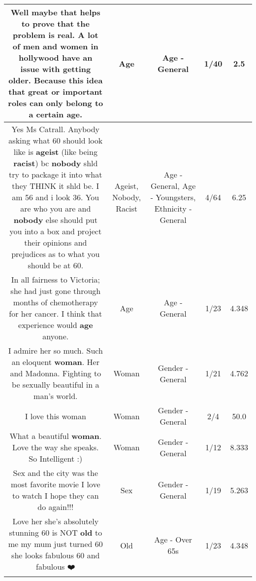 \documentclass[11pt]{article}
\newlength\mylength
\begin{document}
\begin{center}
\begin{longtable}{|C{.65\mylength}|C{.30\mylength}|C{.12\mylength}|C{.12\mylength}|C{.12\mylength}|}
  \small Well maybe that helps to prove that the problem is real. A lot of men and women in hollywood have an issue with getting older. Because this idea that great or important roles can only belong to a certain \textbf{age}.\normalsize   & Age & Age - General & 1/40 & 2.5 \\  \hline
  \small Yes Ms Catrall. Anybody asking what 60 should look like is \textbf{ageist} (like being \textbf{racist}) bc \textbf{nobody} shld try to package it into what they THINK it shld be. I am 56 and i look 36. You are who you are and \textbf{nobody} else should put you into a box and project their opinions and prejudices as to what you should be at 60.\normalsize   & Ageist, Nobody, Racist & Age - General, Age - Youngsters, Ethnicity - General & 4/64 & 6.25 \\  \hline
  \small In all fairness to Victoria; she had just gone through months of chemotherapy for her cancer. I think that experience would \textbf{age} anyone.\normalsize   & Age & Age - General & 1/23 & 4.348 \\  \hline
  \small I admire her so much. Such an eloquent \textbf{woman}. Her and Madonna. Fighting to be sexually beautiful in a man's world.\normalsize   & Woman & Gender - General & 1/21 & 4.762 \\  \hline
  \small I love this woman\normalsize   & Woman & Gender - General & 2/4 & 50.0 \\  \hline
  \small What a beautiful \textbf{woman}. Love the way she speaks. So Intelligent :)\normalsize   & Woman & Gender - General & 1/12 & 8.333 \\  \hline
  \small Sex and the city was the most favorite movie I love to watch I hope they can do again!!!\normalsize   & Sex & Gender - General & 1/19 & 5.263 \\  \hline
  \small Love her she's absolutely stunning 60 is NOT \textbf{old} to me my mum just turned 60 she looks fabulous 60 and fabulous ❤️\normalsize   & Old & Age - Over 65s & 1/23 & 4.348 \\  \hline

\end{longtable}
\end{center}
\end{document}
